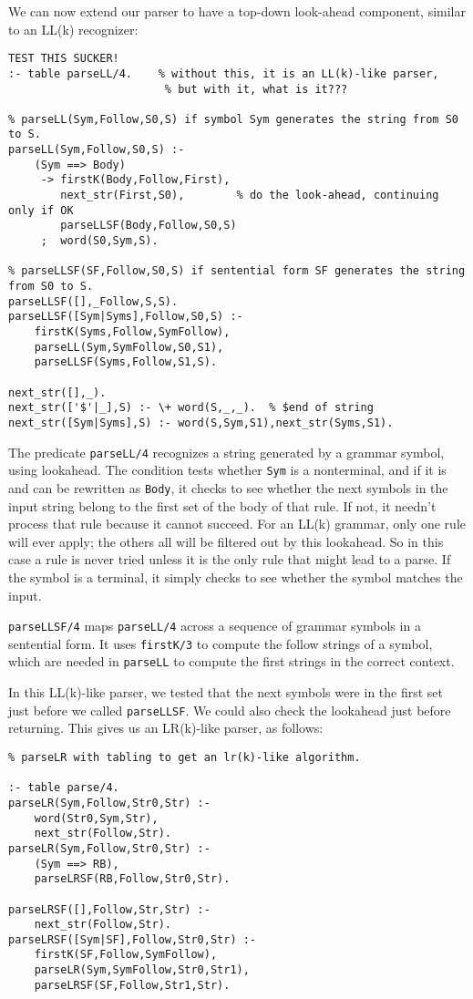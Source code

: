 We can now extend our parser to have a top-down look-ahead component,
similar to an LL(k) recognizer:
\begin{verbatim}
TEST THIS SUCKER!
:- table parseLL/4.    % without this, it is an LL(k)-like parser,
                        % but with it, what is it???

% parseLL(Sym,Follow,S0,S) if symbol Sym generates the string from S0 to S.
parseLL(Sym,Follow,S0,S) :-
    (Sym ==> Body)
     -> firstK(Body,Follow,First),
        next_str(First,S0),        % do the look-ahead, continuing only if OK
        parseLLSF(Body,Follow,S0,S)
     ;  word(S0,Sym,S).

% parseLLSF(SF,Follow,S0,S) if sentential form SF generates the string from S0 to S.
parseLLSF([],_Follow,S,S).
parseLLSF([Sym|Syms],Follow,S0,S) :-
    firstK(Syms,Follow,SymFollow),
    parseLL(Sym,SymFollow,S0,S1),
    parseLLSF(Syms,Follow,S1,S).

next_str([],_).
next_str(['$'|_],S) :- \+ word(S,_,_).  % $end of string
next_str([Sym|Syms],S) :- word(S,Sym,S1),next_str(Syms,S1).
\end{verbatim}

The predicate \verb|parseLL/4| recognizes a string generated by a
grammar symbol, using lookahead.  The condition tests whether
\verb|Sym| is a nonterminal, and if it is and can be rewritten as
\verb|Body|, it checks to see whether the next symbols in the input
string belong to the first set of the body of that rule.  If not, it
needn't process that rule because it cannot succeed.  For an LL(k)
grammar, only one rule will ever apply; the others all will be
filtered out by this lookahead.  So in this case a rule is never tried
unless it is the only rule that might lead to a parse.  If the symbol
is a terminal, it simply checks to see whether the symbol matches the
input.

\verb|parseLLSF/4| maps \verb|parseLL/4| across a sequence of grammar
symbols in a sentential form.  It uses \verb|firstK/3| to compute the
follow strings of a symbol, which are needed in \verb|parseLL| to
compute the first strings in the correct context.

In this LL(k)-like parser, we tested that the next symbols were in the
first set just before we called \verb|parseLLSF|.  We could also check
the lookahead just before returning.  This gives us an LR(k)-like
parser, as follows:

\begin{verbatim}
% parseLR with tabling to get an lr(k)-like algorithm.  

:- table parse/4.
parseLR(Sym,Follow,Str0,Str) :-
    word(Str0,Sym,Str),
    next_str(Follow,Str).
parseLR(Sym,Follow,Str0,Str) :-
    (Sym ==> RB),
    parseLRSF(RB,Follow,Str0,Str).

parseLRSF([],Follow,Str,Str) :- 
    next_str(Follow,Str).
parseLRSF([Sym|SF],Follow,Str0,Str) :- 
    firstK(SF,Follow,SymFollow),
    parseLR(Sym,SymFollow,Str0,Str1),
    parseLRSF(SF,Follow,Str1,Str).

\end{verbatim}

